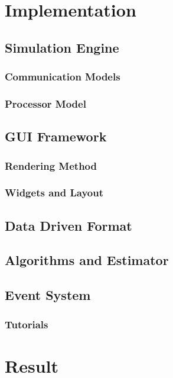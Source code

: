 \documentclass[msc,deptreport, cs]{infthesis}
\begin{document}
\chapter{Implementation}

\section{Simulation Engine}

\subsection{Communication Models}

\subsection{Processor Model}

\section{GUI Framework}

\subsection{Rendering Method}

\subsection{Widgets and Layout}

\section{Data Driven Format}

\section{Algorithms and Estimator}

\section{Event System}

\subsection{Tutorials}

\chapter{Result}
\end{document}
